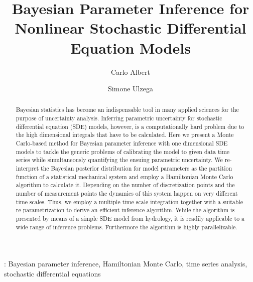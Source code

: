 \documentclass[12pt,a4paper,final]{iopart}
\begin{document}
\title[Parameter inference with stochastic models]{Bayesian Parameter Inference for Nonlinear Stochastic Differential Equation Models}

\author[cor1]{Carlo Albert}%
\address{Eawag, Swiss Federal Institute of Aquatic Science and Technology, 8600 D\"ubendorf, Switzerland}

\author{Simone Ulzega}
\address{Eawag, Swiss Federal Institute of Aquatic Science and Technology, 8600 D\"ubendorf, Switzerland}



\begin{abstract}
Bayesian statistics has become an indispensable tool in many applied sciences for the purpose of uncertainty analysis.
Inferring parametric uncertainty for stochastic differential equation (SDE) models, however, is a computationally hard problem due to the high dimensional integrals that have to be calculated.
Here we present a Monte Carlo-based method for Bayesian parameter inference with one dimensional SDE models to tackle the generic problems of calibrating the model to given data time series while simultaneously quantifying the ensuing parametric uncertainty.
We re-interpret the Bayesian posterior distribution for model parameters as the partition function of a statistical mechanical system and employ a Hamiltonian Monte Carlo algorithm to calculate it.
Depending on the number of discretization points and the number of measurement points the dynamics of this system happen on very different time scales.
Thus, we employ a multiple time scale integration together with a suitable re-parametrization to derive an efficient inference algorithm.
While the algorithm is presented by means of a simple SDE model from hydrology, it is readily applicable to a wide range of inference problems. Furthermore the algorithm is highly parallelizable.

\end{abstract}

\vspace{2pc}
: Bayesian parameter inference, Hamiltonian Monte Carlo, time series analysis, stochastic differential equations
\end{document}
